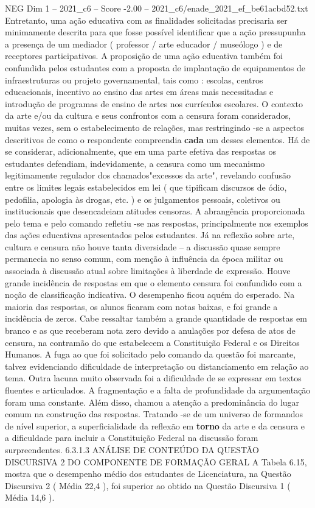 \begin{textsample}{NEG Dim 1 – 2021\_c6 – Score -2.00 – 2021\_c6/enade\_2021\_ef\_be61acbd52.txt}
Entretanto, uma ação educativa com as finalidades solicitadas precisaria ser minimamente descrita para que fosse possível identificar que a ação pressupunha a presença de um mediador ( professor / arte educador / museólogo ) e de receptores participativos.
A proposição de uma ação educativa também foi confundida pelos estudantes com a proposta de implantação de equipamentos de infraestruturas ou projeto governamental, tais como : escolas, centros educacionais, incentivo ao ensino das artes em áreas mais necessitadas e introdução de programas de ensino de artes nos currículos escolares.
O contexto da arte e/ou da cultura e seus confrontos com a censura foram considerados, muitas vezes, sem o estabelecimento de relações, mas restringindo -se a aspectos descritivos de como o respondente compreendia \textbf{cada} um desses elementos.
Há de se considerar, adicionalmente, que em uma parte efetiva das respostas os estudantes defendiam, indevidamente, a censura como um mecanismo legitimamente regulador dos chamados"excessos da arte", revelando confusão entre os limites legais estabelecidos em lei ( que tipificam discursos de ódio, pedofilia, apologia às drogas, etc. ) e os julgamentos pessoais, coletivos ou institucionais que desencadeiam atitudes censoras.
A abrangência proporcionada pelo tema e pelo comando refletiu -se nas respostas, principalmente nos exemplos das ações educativas apresentados pelos estudantes.
Já na reflexão sobre arte, cultura e censura não houve tanta diversidade – a discussão quase sempre permanecia no senso comum, com menção à influência da época militar ou associada à discussão atual sobre limitações à liberdade de expressão.
Houve grande incidência de respostas em que o elemento censura foi confundido com a noção de classificação indicativa.
O desempenho ficou aquém do esperado.
Na maioria das respostas, os alunos ficaram com notas baixas, e foi grande a incidência de zeros.
Cabe ressaltar também a grande quantidade de respostas em branco e as que receberam nota zero devido a anulações por defesa de atos de censura, na contramão do que estabelecem a Constituição Federal e os Direitos Humanos.
A fuga ao que foi solicitado pelo comando da questão foi marcante, talvez evidenciando dificuldade de interpretação ou distanciamento em relação ao tema.
Outra lacuna muito observada foi a dificuldade de se expressar em textos fluentes e articulados.
A fragmentação e a falta de profundidade da argumentação foram uma constante.
Além disso, chamou a atenção a predominância do lugar comum na construção das respostas.
Tratando -se de um universo de formandos de nível superior, a superficialidade da reflexão em \textbf{torno} da arte e da censura e a dificuldade para incluir a Constituição Federal na discussão foram surpreendentes. 6.3.1.3 ANÁLISE DE CONTEÚDO DA QUESTÃO DISCURSIVA 2 DO COMPONENTE DE FORMAÇÃO GERAL A Tabela 6.15, mostra que o desempenho médio dos estudantes de Licenciatura, na Questão Discursiva 2 ( Média 22,4 ), foi superior ao obtido na Questão Discursiva 1 ( Média 14,6 ).

\end{textsample}
